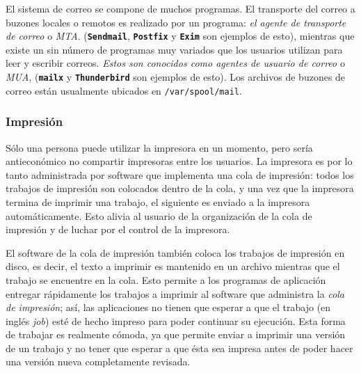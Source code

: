 \documentclass[12pt]{article}
\begin{document}
 El sistema de correo se compone de muchos programas. El transporte del
correo a buzones locales o remotos es realizado por un programa: \textit{el
agente de transporte de correo} o \textit{MTA}.
(\texttt{\textbf{Sendmail}}, \texttt{\textbf{Postfix}} y \texttt{\textbf{Exim}} son ejemplos de
esto), mientras que existe un sin número de programas muy variados que los
usuarios utilizan para leer y escribir correos. \textit{Estos son conocidos
como agentes de usuario de correo }o \textit{MUA},
(\texttt{\textbf{mailx}} y \texttt{\textbf{Thunderbird}} son ejemplos de esto). Los
archivos de buzones de correo están usualmente ubicados en
\texttt{/var/spool/mail}.  



\subsubsection{Impresión}

 Sólo una persona puede utilizar la impresora en un momento, pero
sería antieconómico no compartir impresoras entre los usuarios. La impresora es
por lo tanto administrada por software que implementa una cola de impresión:
todos los trabajos de impresión son colocados dentro de la cola, y una vez que
la impresora termina de imprimir una trabajo, el siguiente es enviado a la
impresora automáticamente. Esto alivia al usuario de la organización de la cola
de impresión y de luchar por el control de la impresora.  

 El software de la cola de impresión también coloca los trabajos de
impresión en disco, es decir, el texto a imprimir es mantenido en un archivo
mientras que el trabajo se encuentre en la cola. Esto permite a los programas de
aplicación entregar rápidamente los trabajos a imprimir al software que
administra la \textit{cola de impresión}; así, las aplicaciones no
tienen que esperar a que el trabajo (en inglés \textit{job}) esté de hecho impreso para
poder continuar su ejecución. Esta forma de trabajar es realmente cómoda, ya que
permite enviar a imprimir una versión de un trabajo y no tener que esperar a que
ésta sea impresa antes de poder hacer una versión nueva completamente revisada.


\end{document}
